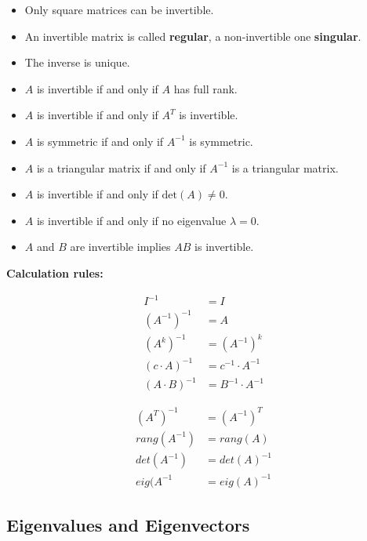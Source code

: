 \documentclass[8pt, a4paper, landscape, includeheadfoot]{extarticle}
\begin{document}
\begin{multicols*}{4}
\begin{itemize}[leftmargin=0.29cm, itemsep=0pt]
\item Only square matrices can be invertible.
\item An invertible matrix is called \textbf{regular}, a non-invertible one \textbf{singular}.
\item The inverse is unique.
\item \( A \) is invertible if and only if \( A \) has full rank.
\item \( A \) is invertible if and only if \( A^T \) is invertible.
\item \( A \) is symmetric if and only if \( A^{-1} \) is symmetric.
\item \( A \) is a triangular matrix if and only if \( A^{-1} \) is a triangular matrix.
\item \( A \) is invertible if and only if \( \text{det}(A) \neq 0 \).
\item \( A \) is invertible if and only if no eigenvalue \( \lambda = 0 \).
\item \( A \) and \( B \) are invertible implies \( AB \) is invertible.
\end{itemize}

\textbf{Calculation rules:}

\vspace{-5mm}
\begin{minipage}[t]{0.49 \columnwidth}
\begin{align}
I^{-1} &= I\nonumber \\
(A^{-1})^{-1} &= A \nonumber \\
(A^k)^{-1} &= (A^{-1})^k \nonumber \\
(c\cdot A)^{-1} &= c^{-1} \cdot A^{-1} \nonumber \\
(A\cdot B)^{-1} &= B^{-1} \cdot A^{-1} \nonumber
\end{align}
\end{minipage}
\begin{minipage}[t]{0.49 \columnwidth}
\begin{align}
(A^T)^{-1} &= (A^{-1})^T \nonumber \\
rang(A^{-1}) &= rang(A) \nonumber \\
det(A^{-1}) &= det(A)^{-1} \nonumber \\
eig(A^{-1} &= eig(A)^{-1} \nonumber 
\end{align}
\end{minipage}

\subsection{Eigenvalues and Eigenvectors}


\end{multicols*}
\end{document}

